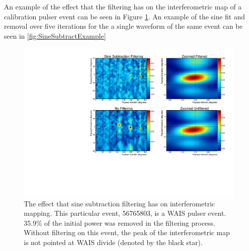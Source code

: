 	An example of the effect that the filtering has on the interferometric map of a calibration pulser event can be seen in Figure \ref{fig:SineSubtractMaps}.  An example of the sine fit and removal over five iterations for the a single waveform of the same event can be seen in \ref{fig:SineSubtractExample} 
	
\begin{figure}
	\centering
	\includegraphics[height=0.5\textheight]{figures/SineSubtractMaps}
	\caption{The effect that sine subtraction filtering has on interferometric mapping.  This particular event, 56765803, is a WAIS pulser event.  35.9\% of the initial power was removed in the filtering process.  Without filtering on this event, the peak of the interferometric map is not pointed at WAIS divide (denoted by the black star).} 
	\label{fig:SineSubtractMaps}
\end{figure}


